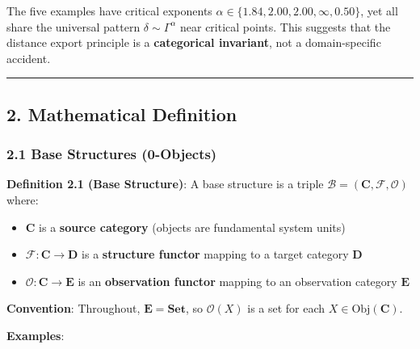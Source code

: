 \documentclass[
]{article}
\providecommand{\tightlist}{%
  \setlength{\itemsep}{0pt}\setlength{\parskip}{0pt}}
\begin{document}
The five examples have critical exponents
\(\alpha \in \{1.84, 2.00, 2.00, \infty, 0.50\}\), yet all share the
universal pattern \(\delta \sim \Gamma^\alpha\) near critical points.
This suggests that the distance export principle is a
\textbf{categorical invariant}, not a domain-specific accident.

\begin{center}\rule{0.5\linewidth}{0.5pt}\end{center}

\subsection{2. Mathematical Definition}\label{mathematical-definition}

\subsubsection{2.1 Base Structures
(0-Objects)}\label{base-structures-0-objects}

\textbf{Definition 2.1 (Base Structure)}: A base structure is a triple
\(\mathcal{B} = (\mathbf{C}, \mathcal{F}, \mathcal{O})\) where:

\begin{itemize}
\tightlist
\item
  \(\mathbf{C}\) is a \textbf{source category} (objects are fundamental
  system units)
\item
  \(\mathcal{F}: \mathbf{C} \to \mathbf{D}\) is a \textbf{structure
  functor} mapping to a target category \(\mathbf{D}\)
\item
  \(\mathcal{O}: \mathbf{C} \to \mathbf{E}\) is an \textbf{observation
  functor} mapping to an observation category \(\mathbf{E}\)
\end{itemize}

\textbf{Convention}: Throughout, \(\mathbf{E} = \mathbf{Set}\), so
\(\mathcal{O}(X)\) is a set for each \(X \in \text{Obj}(\mathbf{C})\).

\textbf{Examples}:
\end{document}
